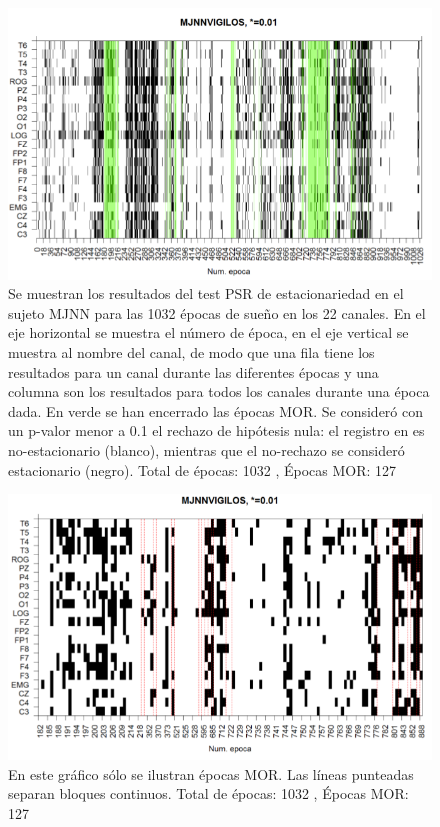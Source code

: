 \begin{figure}
\includegraphics[width=\textwidth]{est01.png} 
\caption{Se muestran los resultados del test PSR de estacionariedad en el sujeto MJNN para las 1032 épocas de sueño en los
22 canales. En el eje horizontal se muestra el número de época, en el eje vertical se muestra al nombre del canal, de
modo que una fila tiene los resultados para un canal durante las diferentes épocas y una columna son los resultados
para todos los canales durante una época dada. En verde se han encerrado las épocas MOR.
Se consideró con un p-valor menor a 0.1 el rechazo de hipótesis nula: el registro en es no-estacionario (blanco),
mientras que el no-rechazo se consideró estacionario (negro).
Total de épocas: 1032 , Épocas MOR: 127}
\end{figure}

\begin{figure}
\includegraphics[width=\textwidth]{est02.png} 
\caption{En este gráfico sólo se ilustran épocas MOR. Las líneas punteadas separan bloques continuos.
Total de épocas: 1032 , Épocas MOR: 127}
\end{figure}

